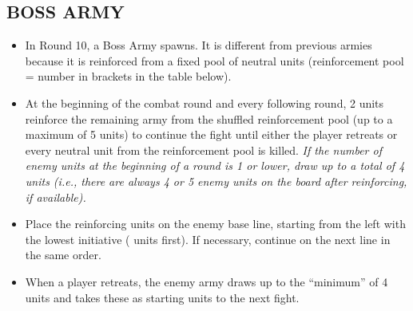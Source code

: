 \begin{multicols}{2}
\subsection*{\MakeUppercase{Boss Army}}

\begin{itemize}
  \item In Round 10, a Boss Army spawns. It is different from previous armies because it is reinforced from a fixed pool of neutral units (reinforcement pool = number in brackets in the table below).
  \item At the beginning of the  combat round and every following round, 2 units reinforce the remaining army from the shuffled reinforcement pool (up to a maximum of 5 units) to continue the fight until either the player retreats or every neutral unit from the reinforcement pool is killed. \textit{If the number of enemy units at the beginning of a round is 1 or lower, draw up to a total of 4 units (i.e., there are always 4 or 5 enemy units on the board after reinforcing, if available).}
  \item Place the reinforcing units on the enemy base line, starting from the left with the lowest initiative ( units first). If necessary, continue on the next line in the same order.
  \item When a player retreats, the enemy army draws up to the ``minimum'' of 4 units and takes these as starting units to the next fight.
\end{itemize}

\columnbreak

\vspace*{\fill}

\end{multicols}



\vspace*{\fill}

